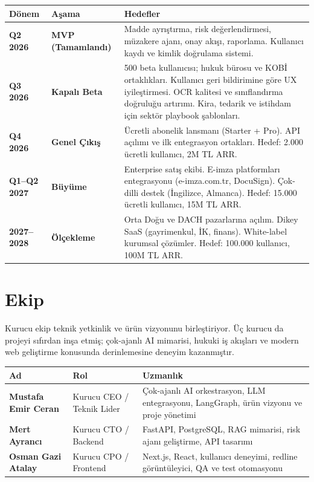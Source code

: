 \documentclass[12pt,a4paper]{article}
\begin{document}
\begin{longtable}{>{\bfseries}p{2.5cm} >{\color{primary}\bfseries}p{3cm} p{8cm}}
\toprule
\textbf{Dönem} & \textbf{Aşama} & \textbf{Hedefler} \\
\midrule
\endhead
Q2 2026 & \color{success}MVP (Tamamlandı) &
Madde ayrıştırma, risk değerlendirmesi, müzakere ajanı, onay akışı, raporlama.
Kullanıcı kaydı ve kimlik doğrulama sistemi. \\[6pt]

Q3 2026 & Kapalı Beta &
500 beta kullanıcısı; hukuk bürosu ve KOBİ ortaklıkları.
Kullanıcı geri bildirimine göre UX iyileştirmesi.
OCR kalitesi ve sınıflandırma doğruluğu artırımı.
Kira, tedarik ve istihdam için sektör playbook şablonları. \\[6pt]

Q4 2026 & Genel Çıkış &
Ücretli abonelik lansmanı (Starter + Pro).
API açılımı ve ilk entegrasyon ortakları.
Hedef: 2.000 ücretli kullanıcı, 2M TL ARR. \\[6pt]

Q1–Q2 2027 & Büyüme &
Enterprise satış ekibi.
E-imza platformları entegrasyonu (e-imza.com.tr, DocuSign).
Çok-dilli destek (İngilizce, Almanca).
Hedef: 15.000 ücretli kullanıcı, 15M TL ARR. \\[6pt]

2027–2028 & Ölçekleme &
Orta Doğu ve DACH pazarlarına açılım.
Dikey SaaS (gayrimenkul, İK, finans).
White-label kurumsal çözümler.
Hedef: 100.000 kullanıcı, 100M TL ARR. \\
\bottomrule
\end{longtable}

\section{Ekip}

\begin{highlightbox}
Kurucu ekip teknik yetkinlik ve ürün vizyonunu birleştiriyor. Üç kurucu da projeyi sıfırdan
inşa etmiş; çok-ajanlı AI mimarisi, hukuki iş akışları ve modern web geliştirme konusunda
derinlemesine deneyim kazanmıştır.
\end{highlightbox}

\vspace{0.5em}

\begin{longtable}{>{\bfseries}p{4.5cm} p{3.5cm} p{6cm}}
\toprule
\textbf{Ad} & \textbf{Rol} & \textbf{Uzmanlık} \\
\midrule
Mustafa Emir Ceran & Kurucu CEO / Teknik Lider &
Çok-ajanlı AI orkestrasyon, LLM entegrasyonu, LangGraph, ürün vizyonu ve proje yönetimi \\[6pt]
Mert Ayrancı & Kurucu CTO / Backend &
FastAPI, PostgreSQL, RAG mimarisi, risk ajanı geliştirme, API tasarımı \\[6pt]
Osman Gazi Atalay & Kurucu CPO / Frontend &
Next.js, React, kullanıcı deneyimi, redline görüntüleyici, QA ve test otomasyonu \\
\bottomrule
\end{longtable}
\end{document}
